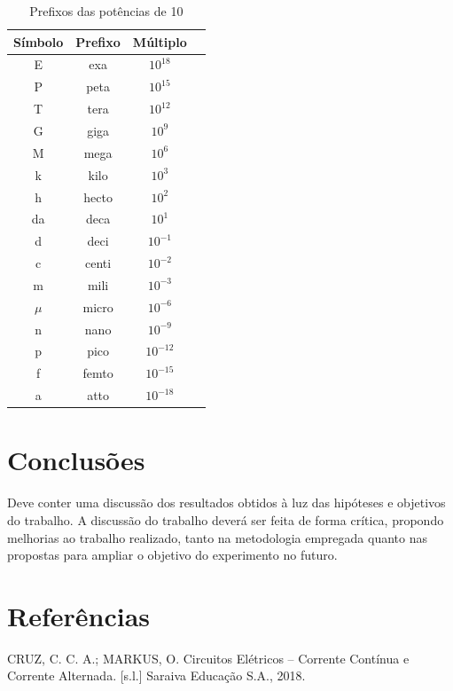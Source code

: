 \documentclass[a4paper]{article}
\begin{document}
\begin{table}[h]
    \centering
    \begin{tabular}{cccc}
        \hline
        Símbolo & Prefixo & Múltiplo \\
        \hline \hline
        E & exa & $10^{18}$ \\
        P & peta & $10^{15}$ \\
        T & tera & $10^{12}$ \\
        G & giga & $10^{9}$ \\
        M & mega & $10^{6}$ \\
        k & kilo & $10^{3}$ \\
        h & hecto & $10^{2}$  \\
        da & deca & $10^{1}$ \\
        d & deci & $10^{-1}$ \\
        c & centi & $10^{-2}$ \\
        m & mili & $10^{-3}$ \\
        $\mu$ & micro & $10^{-6}$ \\
        n & nano & $10^{-9}$ \\
        p & pico & $10^{-12}$ \\
        f & femto & $10^{-15}$ \\
        a & atto & $10^{-18}$ \\
        \hline
    \end{tabular}
    \caption{Prefixos das potências de 10}
    \label{tbl:prefixos}
\end{table}

\section{Conclusões}
Deve conter uma discussão dos resultados obtidos à luz das hipóteses e objetivos do trabalho. A discussão do trabalho deverá ser feita de forma crítica, propondo melhorias ao trabalho realizado, tanto na metodologia empregada quanto nas propostas para ampliar o objetivo do experimento no futuro.

\section{Referências}
CRUZ, C. C. A.; MARKUS, O. Circuitos Elétricos – Corrente Contínua e Corrente Alternada. [s.l.] Saraiva Educação S.A., 2018.
\end{document}
